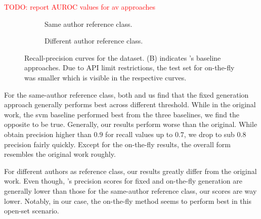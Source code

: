\textcolor{red}{TODO: report AUROC values for av approaches}
\begin{figure}[htbp]
  \centering
  \begin{subfigure}[b]{0.495\textwidth}
    \centering
    
    \caption{Same author reference class. }
    \label{fig:blog_same_author}
  \end{subfigure}
  \hfill
  \begin{subfigure}[b]{0.495\textwidth}
    \centering
    
    \caption{Different author reference class.}
    \label{fig:blog_diff_author}
  \end{subfigure}
  \caption{Recall-precision curves for the \dataBlog{} dataset. 
  (B) indicates \citet{koppel_determining_2014}'s baseline approaches.
  Due to API limit restrictions, the test set for on-the-fly was smaller which is visible in the respective curves.}
  \label{fig:diff_imp_gen_blog}
\end{figure}

For the same-author reference class, both \citet{koppel_determining_2014} and us find that the fixed \imp{} generation approach generally performs best across different threshold.
While in the original work, the \ac{svm} baseline performed best from the three baselines, we find the opposite to be true.
Generally, our results perform worse than the original. 
While \citet{koppel_determining_2014} obtain precision higher than $0.9$ for recall values up to $0.7$, we drop to sub $0.8$ precision fairly quickly.
Except for the on-the-fly results, the overall form resembles the original work roughly.


For different authors as reference class, our results greatly differ from the original work.
Even though, \citet{koppel_determining_2014}'s precision scores for fixed and on-the-fly \imp{} generation are generally lower than those for the same-author reference class, our scores are way lower.
Notably, in our case, the on-the-fly method seems to perform best in this open-set scenario.

